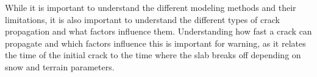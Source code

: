   
  While it is important to understand the different modeling methods and their limitations, it is also important to understand the different types of crack propagation and what factors influence them. Understanding how fast a crack can propagate and which factors influence this is important for warning, as it relates the time of the initial crack to the time where the slab breaks off depending on snow and terrain parameters.  \par

  
